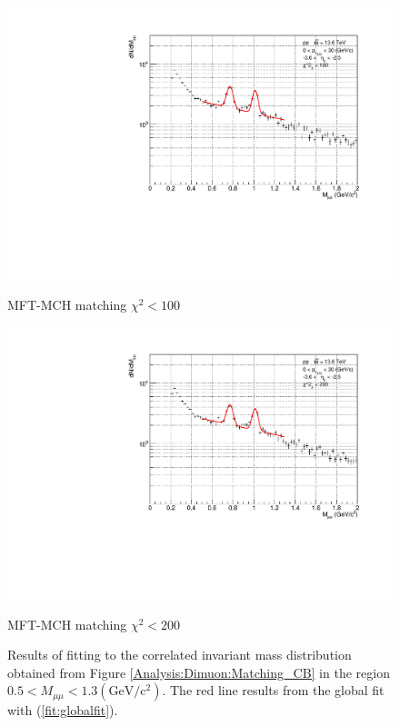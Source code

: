 \begin{figure}[H]
\begin{minipage}{0.45\textwidth}
                \end{minipage}
                \\
                \vspace{1em}
                \begin{minipage}{0.45\textwidth}
                    \centering
                    \includegraphics[width=\textwidth]{fig/3_4_4_Fit_chi2_100.pdf}
                    \caption*{MFT-MCH matching $\chi^2 < 100$}
                \end{minipage}
                \hfill
                \begin{minipage}{0.45\textwidth}
                    \centering
                    \includegraphics[width=\textwidth]{fig/3_4_4_Fit_chi2_200.pdf}
                    \caption*{MFT-MCH matching $\chi^2 < 200$}
                \end{minipage}
                \caption{Results of fitting to the correlated invariant mass distribution obtained from Figure \ref{Analysis:Dimuon:Matching_CB} in the region $0.5 < M_{\mu\mu} < 1.3 (\mathrm{GeV/c^2})$. The red line results from the global fit with (\ref{fit:globalfit}).}
                \label{Analysis:Dimuon:Matching_Fit}
            \end{figure}
